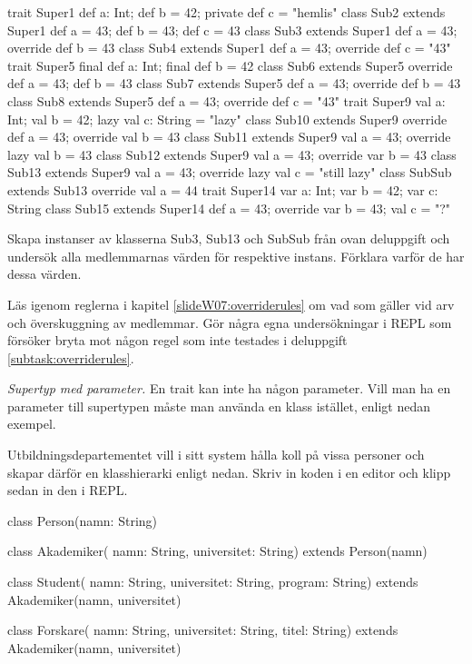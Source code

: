 \begin{REPL}
trait Super1 { def a: Int; def b = 42; private def c = "hemlis" }
class Sub2 extends Super1 { def a = 43; def b = 43; def c = 43 }   
class Sub3 extends Super1 { def a = 43; override def b = 43 }   
class Sub4 extends Super1 { def a = 43; override def c = "43" } 
trait Super5 { final def a: Int; final def b = 42 }
class Sub6 extends Super5 { override def a = 43; def b = 43 }   
class Sub7 extends Super5 { def a = 43; override def b = 43 }   
class Sub8 extends Super5 { def a = 43; override def c = "43" }   
trait Super9 { val a: Int; val b = 42; lazy val c: String = "lazy" }
class Sub10 extends Super9 { override def a = 43; override val b = 43 }   
class Sub11 extends Super9 { val a = 43; override lazy val b = 43 }   
class Sub12 extends Super9 { val a = 43; override var b = 43 }
class Sub13 extends Super9 { val a = 43; override lazy val c = "still lazy" } 
class SubSub extends Sub13 { override val a = 44}  
trait Super14 { var a: Int; var b = 42; var c: String }
class Sub15 extends Super14 { def a = 43; override var b = 43; val c = "?" } 
\end{REPL}

\Subtask Skapa instanser av klasserna Sub3, Sub13 och SubSub från ovan deluppgift och undersök alla medlemmarnas värden för respektive instans. Förklara varför de har dessa värden.

\Subtask Läs igenom reglerna i kapitel  \ref{slideW07:overriderules} om vad som gäller vid arv och överskuggning av medlemmar. Gör några egna undersökningar i REPL som försöker bryta mot någon regel som inte testades i deluppgift \ref{subtask:overriderules}.

\Task \emph{Supertyp med parameter.} En trait kan inte ha någon parameter. Vill man ha en parameter till supertypen måste man använda en klass istället, enligt nedan exempel. 

Utbildningsdepartementet vill i sitt system hålla koll på vissa personer och skapar därför en klasshierarki enligt nedan. Skriv in koden i en editor och klipp sedan in den i REPL.
\begin{Code}
class Person(namn: String)

class Akademiker(
  namn: String,   
  universitet: String) extends Person(namn)

class Student(
  namn: String, 
  universitet: String,
  program: String) extends Akademiker(namn, universitet)

class Forskare(
  namn: String, 
  universitet: String, 
  titel: String) extends Akademiker(namn, universitet)
\end{Code} 


